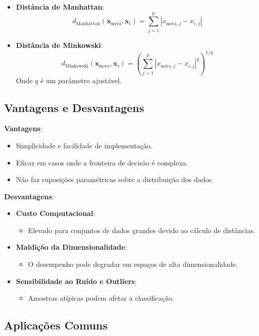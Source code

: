 \documentclass{sciposter}
\begin{document}
\begin{multicols}{3}
\begin{itemize}
    \item \textbf{Distância de Manhattan}:
    \[
    d_{\text{Manhattan}}(\mathbf{x}_{\text{nova}}, \mathbf{x}_i) = \sum_{j=1}^{p} |x_{\text{nova},j} - x_{i,j}|
    \]
    \item \textbf{Distância de Minkowski}:
    \[
    d_{\text{Minkowski}}(\mathbf{x}_{\text{nova}}, \mathbf{x}_i) = \left( \sum_{j=1}^{p} |x_{\text{nova},j} - x_{i,j}|^q \right)^{1/q}
    \]
    Onde $q$ é um parâmetro ajustável.
\end{itemize}

\subsection{Vantagens e Desvantagens}

\textbf{Vantagens}:

\begin{itemize}
    \item Simplicidade e facilidade de implementação.
    \item Eficaz em casos onde a fronteira de decisão é complexa.
    \item Não faz suposições paramétricas sobre a distribuição dos dados.
\end{itemize}

\textbf{Desvantagens}:

\begin{itemize}
    \item \textbf{Custo Computacional}:
    \begin{itemize}
        \item Elevado para conjuntos de dados grandes devido ao cálculo de distâncias.
    \end{itemize}
    \item \textbf{Maldição da Dimensionalidade}:
    \begin{itemize}
        \item O desempenho pode degradar em espaços de alta dimensionalidade.
    \end{itemize}
    \item \textbf{Sensibilidade ao Ruído e Outliers}:
    \begin{itemize}
        \item Amostras atípicas podem afetar a classificação.
    \end{itemize}
\end{itemize}

\subsection{Aplicações Comuns}


\end{multicols}
\end{document}
